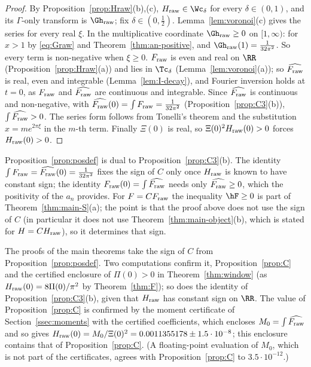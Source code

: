 \begin{proof}
By Proposition~\ref{prop:Hraw}(b),(c), $H_{\rm raw}\in\Wc_\delta$ for every $\delta\in(0,1)$, and its $\Gamma$-only transform is $\Gh_{\rm raw}$; fix
$\delta\in(0,\frac12)$. Lemma~\ref{lem:voronoi}(c) gives the series for every real $\xi$. In the multiplicative coordinate $\Gh_{\rm raw}\ge0$ on
$[1,\infty)$: for $x>1$ by \eqref{eq:Graw} and Theorem~\ref{thm:an-positive}, and $\Gh_{\rm raw}(1)=\frac1{32\pi^2}$. So every term is non-negative
when $\xi\ge0$. $F_{\rm raw}$ is even and real on $\RR$ (Proposition~\ref{prop:Hraw}(a)) and lies in $\Tc_\delta$ (Lemma~\ref{lem:voronoi}(a)); so
$\widehat{F_{\rm raw}}$ is real, even and integrable (Lemma~\ref{lem:I-decay}), and Fourier inversion holds at $t=0$, as $F_{\rm raw}$ and
$\widehat{F_{\rm raw}}$ are continuous and integrable. Since $\widehat{F_{\rm raw}}$ is continuous and non-negative, with
$\widehat{F_{\rm raw}}(0)=\int F_{\rm raw}=\frac1{32\pi^2}$ (Proposition~\ref{prop:C3}(b)), $\int\widehat{F_{\rm raw}}>0$. The series form follows from
Tonelli's theorem and the substitution $x=me^{2\pi\xi}$ in the $m$-th term. Finally $\Xi(0)$ is real, so $\Xi(0)^2H_{\rm raw}(0)>0$ forces
$H_{\rm raw}(0)>0$.
\end{proof}

Proposition~\ref{prop:posdef} is dual to Proposition~\ref{prop:C3}(b). The identity $\int F_{\rm raw}=\widehat{F_{\rm raw}}(0)=\frac1{32\pi^2}$ fixes
the sign of $C$ only once $H_{\rm raw}$ is known to have constant sign; the identity $F_{\rm raw}(0)=\int\widehat{F_{\rm raw}}$ needs only
$\widehat{F_{\rm raw}}\ge0$, which the positivity of the $a_n$ provides. For $F=CF_{\rm raw}$ the inequality $\hF\ge0$ is part of
Theorem~\ref{thm:main-S}(a); the point is that the proof above does not use the sign of $C$ (in particular it does not use
Theorem~\ref{thm:main-object}(b), which is stated for $H=CH_{\rm raw}$), so it determines that sign.

\begin{remark}\label{rem:sign}
The proofs of the main theorems take the sign of $C$ from Proposition~\ref{prop:posdef}. Two computations confirm it, Proposition~\ref{prop:C} and
the certified enclosure of $\Pi(0)>0$ in Theorem~\ref{thm:window} (as $H_{\rm raw}(0)=8\Pi(0)/\pi^2$ by Theorem~\ref{thm:F}); so does the identity of
Proposition~\ref{prop:C3}(b), given that $H_{\rm raw}$ has constant sign on $\RR$. The value of Proposition~\ref{prop:C} is
confirmed by the moment certificate of Section~\ref{ssec:moments} with the certified coefficients, which encloses $M_0=\int\widehat{F_{\rm raw}}$ and so
gives $H_{\rm raw}(0)=M_0/\Xi(0)^2=0.0011355178\pm1.5\cdot10^{-8}$; this enclosure contains that of Proposition~\ref{prop:C}. (A
floating-point evaluation of $M_0$, which is not part of the certificates, agrees with Proposition~\ref{prop:C} to $3.5\cdot10^{-12}$.)
\end{remark}

